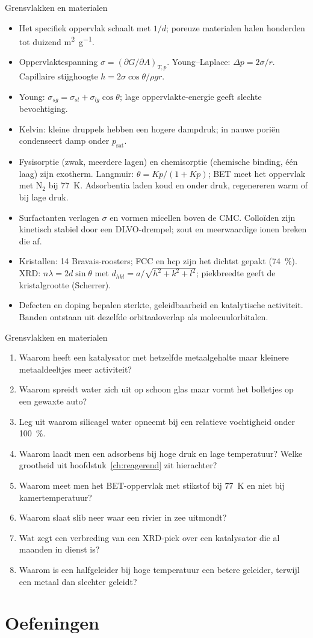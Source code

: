 \begin{samenvatting}{Grensvlakken en materialen}
\begin{itemize}
\item Het specifiek oppervlak schaalt met $1/d$; poreuze materialen halen honderden tot duizend \si{\metre\squared\per\gram}.
\item Oppervlaktespanning $\sigma = (\partial G/\partial A)_{T,p}$. Young--Laplace: $\Delta p = 2\sigma/r$. Capillaire stijghoogte $h = 2\sigma\cos\theta/\rho g r$.
\item Young: $\sigma_{sg} = \sigma_{sl} + \sigma_{lg}\cos\theta$; lage oppervlakte-energie geeft slechte bevochtiging.
\item Kelvin: kleine druppels hebben een hogere dampdruk; in nauwe poriën condenseert damp onder $p_\mathrm{sat}$.
\item Fysisorptie (zwak, meerdere lagen) en chemisorptie (chemische binding, \'e\'en laag) zijn exotherm. Langmuir: $\theta = Kp/(1+Kp)$; BET meet het oppervlak met N$_2$ bij \SI{77}{\kelvin}. Adsorbentia laden koud en onder druk, regenereren warm of bij lage druk.
\item Surfactanten verlagen $\sigma$ en vormen micellen boven de CMC. Colloïden zijn kinetisch stabiel door een DLVO-drempel; zout en meerwaardige ionen breken die af.
\item Kristallen: 14 Bravais-roosters; FCC en hcp zijn het dichtst gepakt (\SI{74}{\percent}). XRD: $n\lambda = 2d\sin\theta$ met $d_{hkl} = a/\sqrt{h^2+k^2+l^2}$; piekbreedte geeft de kristalgrootte (Scherrer).
\item Defecten en doping bepalen sterkte, geleidbaarheid en katalytische activiteit. Banden ontstaan uit dezelfde orbitaaloverlap als molecuulorbitalen.
\end{itemize}
\end{samenvatting}

\begin{reflectie}{Grensvlakken en materialen}
\begin{enumerate}
\item Waarom heeft een katalysator met hetzelfde metaalgehalte maar kleinere metaaldeeltjes meer activiteit?
\item Waarom spreidt water zich uit op schoon glas maar vormt het bolletjes op een gewaxte auto?
\item Leg uit waarom silicagel water opneemt bij een relatieve vochtigheid onder \SI{100}{\percent}.
\item Waarom laadt men een adsorbens bij hoge druk en lage temperatuur? Welke grootheid uit hoofdstuk~\ref{ch:reagerend} zit hierachter?
\item Waarom meet men het BET-oppervlak met stikstof bij \SI{77}{\kelvin} en niet bij kamertemperatuur?
\item Waarom slaat slib neer waar een rivier in zee uitmondt?
\item Wat zegt een verbreding van een XRD-piek over een katalysator die al maanden in dienst is?
\item Waarom is een halfgeleider bij hoge temperatuur een betere geleider, terwijl een metaal dan slechter geleidt?
\end{enumerate}
\end{reflectie}

\newpage
\section{Oefeningen}


